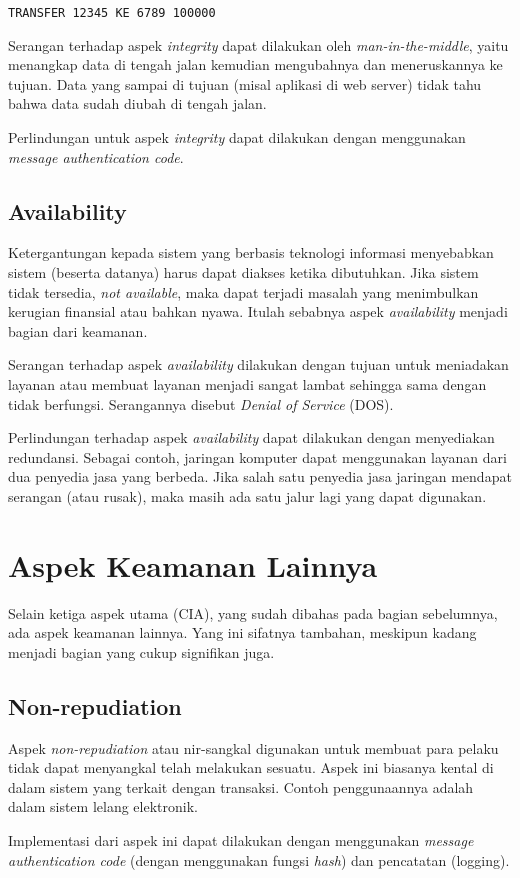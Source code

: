 \begin{verbatim}
TRANSFER 12345 KE 6789 100000
\end{verbatim}

Serangan terhadap aspek {\em integrity} dapat dilakukan oleh
{\em man-in-the-middle}, yaitu menangkap data di tengah jalan
kemudian mengubahnya dan meneruskannya ke tujuan.
Data yang sampai di tujuan (misal aplikasi di web server) tidak tahu
bahwa data sudah diubah di tengah jalan.

Perlindungan untuk aspek {\em integrity} dapat dilakukan dengan
menggunakan {\em message authentication code}.


\subsection{Availability}
Ketergantungan kepada sistem yang berbasis teknologi informasi
menyebabkan sistem (beserta datanya) harus dapat diakses ketika dibutuhkan.
Jika sistem tidak tersedia, {\em not available}, maka dapat terjadi
masalah yang menimbulkan kerugian finansial atau bahkan nyawa.
Itulah sebabnya aspek {\em availability} menjadi bagian dari keamanan.

Serangan terhadap aspek {\em availability} dilakukan dengan tujuan
untuk meniadakan layanan atau membuat layanan menjadi sangat lambat
sehingga sama dengan tidak berfungsi.
Serangannya disebut {\em Denial of Service} (DOS).

Perlindungan terhadap aspek {\em availability} dapat dilakukan
dengan menyediakan redundansi.
Sebagai contoh, jaringan komputer dapat menggunakan layanan dari
dua penyedia jasa yang berbeda.
Jika salah satu penyedia jasa jaringan mendapat serangan (atau rusak),
maka masih ada satu jalur lagi yang dapat digunakan.


\section{Aspek Keamanan Lainnya}
Selain ketiga aspek utama (CIA), yang sudah dibahas pada bagian sebelumnya,
ada aspek keamanan lainnya. Yang ini sifatnya tambahan, meskipun
kadang menjadi bagian yang cukup signifikan juga.

\subsection{Non-repudiation}
Aspek {\em non-repudiation} atau nir-sangkal digunakan untuk
membuat para pelaku tidak dapat menyangkal telah melakukan sesuatu.
Aspek ini biasanya kental di dalam sistem yang terkait dengan transaksi.
Contoh penggunaannya adalah dalam sistem lelang elektronik.

Implementasi dari aspek ini dapat dilakukan dengan menggunakan
{\em message authentication code} (dengan menggunakan fungsi {\em hash})
dan pencatatan (logging).
